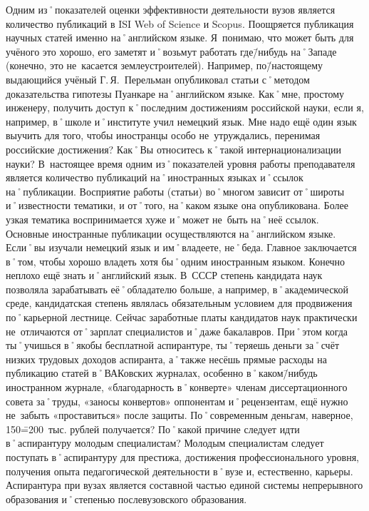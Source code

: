 \begin{drama}
	\maxspeaks Одним из˚показателей оценки эффективности деятельности вузов является количество публикаций в ISI Web of Science и Scopus. Поощряется публикация научных статей именно на˚английском языке. Я~понимаю, что может быть для учёного это хорошо, его заметят и˚возьмут работать где\=/нибудь на˚Западе (конечно, это не~касается землеустроителей). Например, по\=/настоящему выдающийся учёный Г.\,Я.~Перельман опубликовал статьи с˚методом доказательства гипотезы Пуанкаре на˚английском языке. Как˚мне, простому инженеру, получить доступ к˚последним достижениям российской науки, если я, например, в˚школе и˚институте учил немецкий язык. Мне надо ещё один язык выучить для того, чтобы иностранцы особо не~утруждались, перенимая российские достижения? Как˚Вы относитесь к˚такой интернационализации науки?
	\michaelspeaks В~настоящее время одним из˚показателей уровня работы преподавателя является количество публикаций на˚иностранных языках и˚ссылок на˚публикации. Восприятие работы (статьи) во˚многом зависит от˚широты и˚известности тематики, и от˚того, на˚каком языке она опубликована. Более узкая тематика воспринимается хуже и˚может не~быть на˚неё ссылок. Основные иностранные публикации осуществляются на˚английском языке. Если˚вы изучали немецкий язык и им˚владеете, не˚беда. Главное заключается в˚том, чтобы хорошо владеть хотя бы˚одним иностранным языком. Конечно неплохо ещё знать и˚английский язык.
	\maxspeaks В~СССР степень кандидата наук позволяла зарабатывать её˚обладателю больше, а например, в˚академической среде, кандидатская степень являлась обязательным условием для продвижения по˚карьерной лестнице. Сейчас заработные платы кандидатов наук практически не~отличаются от˚зарплат специалистов и˚даже бакалавров. При˚этом когда ты˚учишься в˚якобы бесплатной аспирантуре, ты˚теряешь деньги за˚счёт низких трудовых доходов аспиранта, а˚также несёшь прямые расходы на публикацию статей в˚ВАКовских журналах, особенно в˚каком\=/нибудь иностранном журнале,  «благодарность в˚конверте» членам диссертационного совета за˚труды,  «заносы конвертов» оппонентам и˚рецензентам, ещё нужно не~забыть  «проставиться» после защиты. По˚современным деньгам, наверное, 150\==200~тыс. рублей получается? По˚какой причине следует идти в˚аспирантуру молодым специалистам?
	\michaelspeaks Молодым специалистам следует поступать в˚аспирантуру для престижа, достижения профессионального уровня, получения опыта педагогической деятельности в˚вузе и, естественно, карьеры. Аспирантура при вузах является составной частью единой системы непрерывного образования и˚степенью послевузовского образования.

\end{drama}
